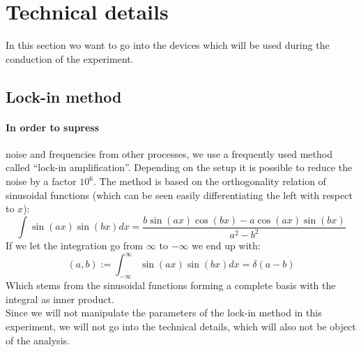 \section{Technical details}
\label{sec:technics}
In this section wo want to go into the devices which will be used during the
conduction of the experiment.
\subsection{Lock-in method}
\paragraph{In order to supress}
noise and frequencies from other processes, we use
a frequently used method called ``lock-in amplification''. Depending on the
setup it is possible to reduce the noise by a factor $10^6$. The method
is based on the orthogonality relation of sinusoidal functions (which
can be seen easily differentiating the left with respect to $x$):
\begin{equation}
    \int \sin(a x) \sin(b x) dx =\frac{ b \sin(a x) \cos(b x)-a \cos(a x)
            \sin(b x)}{a^2-b^2}
\end{equation}
If we let the integration go from $\infty$ to $-\infty$ we end up with:
\begin{equation}
    (a,b) := \int_{-\infty}^{\infty} \sin(a x) \sin(b x) dx = \delta(a - b)
\end{equation}
Which stems from the sinusoidal functions forming a complete basis with
the integral as inner product.\\
Since we will not manipulate the parameters of the lock-in method in this
experiment, we will not go into the technical details, which
will also not be object of the analysis.
